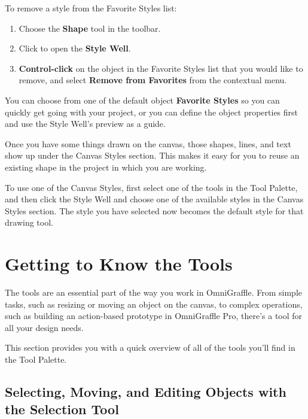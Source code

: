 \documentclass[../main.tex]{subfiles}
\begin{document}
\begin{description}[style=nextline]
\begin{ogpro}
      To remove a style from the Favorite Styles list:

      \begin{enumerate}
        \item Choose the \textbf{Shape} tool in the toolbar.
        \item Click to open the \textbf{Style Well}.
        \item \textbf{Control-click} on the object in the Favorite Styles list that you would like
          to remove, and select \textbf{Remove from Favorites} from the contextual menu.
      \end{enumerate}
    \end{ogpro}

    You can choose from one of the default object \textbf{Favorite Styles} so you can quickly get
    going with your project, or you can define the object properties first and use the Style
    Well's preview as a guide.
  \item[{\textbf{Canvas Styles}}] Once you have some things drawn on the canvas, those shapes,
    lines, and text show up under the Canvas Styles section. This makes it easy for you to reuse
    an existing shape in the project in which you are working.
  \item[{}] To use one of the Canvas Styles, first select one of the tools in the Tool Palette,
    and then click the Style Well and choose one of the available styles in the Canvas Styles
    section. The style you have selected now becomes the default style for that drawing tool.
\end{description}

\section{Getting to Know the Tools}

The tools are an essential part of the way you work in OmniGraffle. From simple tasks, such as
resizing or moving an object on the canvas, to complex operations, such as building an
action-based prototype in OmniGraffle Pro, there's a tool for all your design needs.

This section provides you with a quick overview of all of the tools you'll find in the Tool
Palette.

\subsection{ Selecting, Moving, and Editing Objects
with the Selection Tool}
\end{document}
